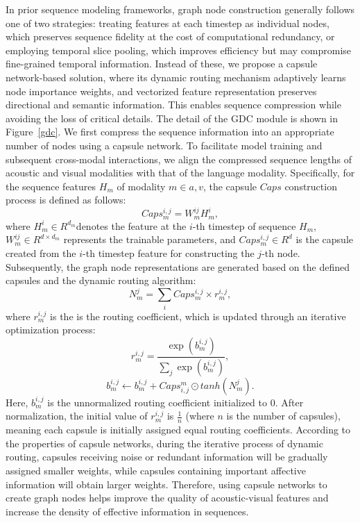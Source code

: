 \documentclass[letterpaper]{article} %
\begin{document}
In prior sequence modeling frameworks, graph node construction generally follows one of two strategies: treating features at each timestep as individual nodes, which preserves sequence fidelity at the cost of computational redundancy, or employing temporal slice pooling, which improves efficiency but may compromise fine-grained temporal information. Instead of these, we propose a capsule network-based solution, where its dynamic routing mechanism adaptively learns node importance weights, and vectorized feature representation preserves directional and semantic information. This enables sequence compression while avoiding the loss of critical details. The detail of the GDC module is shown in Figure~\ref{gdc}.
We first compress the sequence information into an appropriate number of nodes using a capsule network. To facilitate model training and subsequent cross-modal interactions, we align the compressed sequence lengths of acoustic and visual modalities with that of the language modality. Specifically, for the sequence features $H_m$ of modality $m \in{a,v}$, the capsule $Caps$ construction process is defined as follows:
\begin{equation}
   Caps^{i,j}_{m} = W_{m}^{ij} H_{m}^{i},
   \label{cap_generate}
\end{equation}
where $H_{m}^{i} \in R^{d_m}$denotes the feature at the $i$-th timestep of sequence $H_m$, $ W_{m}^{ij} \in R^{d  \times d_m}$ represents the trainable parameters, and $ Caps^{i,j}_{m} \in R^d$ is the capsule created from the $i$-th timestep feature for constructing the $j$-th node.
Subsequently, the graph node representations are generated based on the defined capsules and the dynamic routing algorithm:
\begin{equation}
    N_{m}^{j} = \sum_{i} Caps^{i,j}_{m} \times r_{m}^{i,j},
    \label{node_generate}
\end{equation}
where $r_{m}^{i,j}$ is the is the routing coefficient, which is updated through an iterative optimization process:
\begin{equation}
    r_{m}^{i,j} = \frac{\exp(b_{m}^{i,j})}{\sum_j \exp(b_{m}^{i,j})},
    \label{r_generate}
\end{equation}
\begin{equation}
    b_{m}^{i,j} \leftarrow b_{m}^{i,j} + Caps^{m}_{i,j} \odot tanh( N_{m}^{j}).
    \label{r_update}
\end{equation}
Here, $b_{m}^{i,j}$ is the unnormalized routing coefficient initialized to 0. After normalization, the initial value of $r_{m}^{i,j}$ is $\frac1n$ (where $n$ is the number of capsules), meaning each capsule is initially assigned equal routing coefficients. According to the properties of capsule networks, during the iterative process of dynamic routing, capsules receiving noise or redundant information will be gradually assigned smaller weights, while capsules containing important affective information will obtain larger weights. Therefore, using capsule networks to create graph nodes helps improve the quality of acoustic-visual features and increase the density of effective information in sequences.
\end{document}

